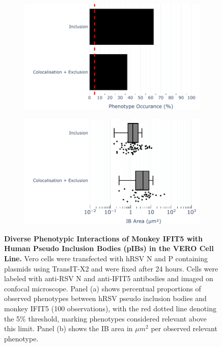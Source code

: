 \begin{figure}
    \begin{subfigure}{0.495\textwidth}
        \caption{}
        \includegraphics[width=1\linewidth]{08. Chapter 3/Figs/03. pIB/05. IFIT5/01. bar_i5_vero.pdf} 
    \end{subfigure}
    \begin{subfigure}{0.495\textwidth}
        \caption{}
        \includegraphics[width=1\linewidth]{08. Chapter 3/Figs/03. pIB/05. IFIT5/02. box_i5_vero.pdf}
    \end{subfigure}
    \caption[Diverse Phenotypic Interactions of Monkey IFIT5 with Human Pseudo Inclusion Bodies (pIBs) in the VERO Cell Line.]{\textbf{Diverse Phenotypic Interactions of Monkey IFIT5 with Human Pseudo Inclusion Bodies (pIBs) in the VERO Cell Line.} Vero cells were transfected with hRSV N and P containing plasmids using TransIT-X2 and were fixed after 24 hours. Cells were labeled with anti-RSV N and anti-IFIT5 antibodies and imaged on confocal microscope. Panel (a) shows percentual proportions of observed phenotypes between hRSV pseudo inclusion bodies and monkey IFIT5 (100 observations), with the red dotted line denoting the 5\% threshold, marking phenotypes considered relevant above this limit. Panel (b) shows the IB area in \(\mu m^2\) per observed relevant phenotype.}
    \label{fig:Diverse Phenotypic Interactions of Monkey IFIT5 with Human Pseudo Inclusion Bodies (pIBs) in the VERO Cell Line}
\end{figure}

